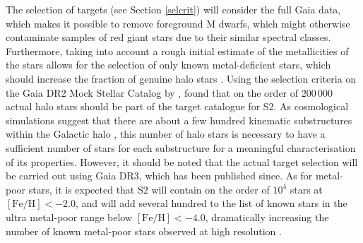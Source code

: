 \documentclass[a4paper,11pt]{article}
\begin{document}
The selection of targets (see Section \ref{selcrit}) will consider the full Gaia data, which makes it possible to remove foreground M dwarfs, which might otherwise contaminate samples of red giant stars due to their similar spectral classes. Furthermore, taking into account a rough initial estimate of the metallicities of the stars allows for the selection of only known metal-deficient stars, which should increase the fraction of genuine halo stars \citep{feltzing18}. Using the selection criteria on the Gaia DR2 Mock Stellar Catalog by \citet{rybizki18}, \citet{4mosts219} found that on the order of 200\,000 actual halo stars should be part of the target catalogue for S2. As cosmological simulations suggest that there are about a few hundred kinematic substructures within the Galactic halo \citep{helmi03,gomez13}, this number of halo stars is necessary to have a sufficient number of stars for each substructure for a meaningful characterisation of its properties. However, it should be noted that the actual target selection will be carried out using Gaia DR3, which has been published since. As for metal-poor stars, it is expected that S2 will contain on the order of $10^4$ stars at $\mathrm{[Fe/H]}<-2.0$, and will add several hundred to the list of known stars in the ultra metal-poor range below $\mathrm{[Fe/H]}<-4.0$, dramatically increasing the number of known metal-poor stars observed at high resolution \citep{4mosts219}.
%
\end{document}
